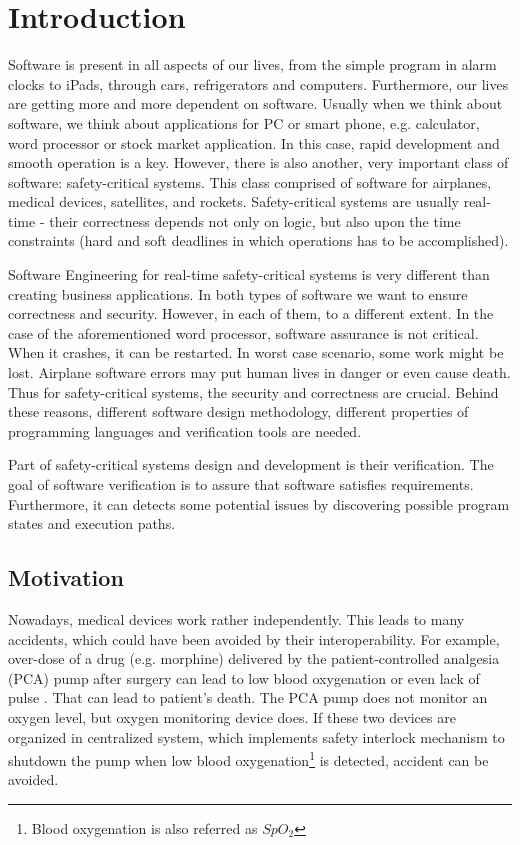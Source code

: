 
\cleardoublepage

\chapter{Introduction}
\label{introduction}

Software is present in all aspects of our lives, from the simple program in alarm clocks to iPads, through cars, refrigerators and computers. Furthermore, our lives are getting more and more dependent on software. Usually when we think about software, we think about applications for PC or smart phone, e.g. calculator, word processor or stock market application. In this case, rapid development and smooth operation is a key. However, there is also another, very important class of software: safety-critical systems. This class comprised of software for airplanes, medical devices, satellites, and rockets. Safety-critical systems are usually real-time - their correctness depends not only on logic, but also upon the time constraints (hard and soft deadlines in which operations has to be accomplished).

Software Engineering for real-time safety-critical systems is very different than creating business applications. In both types of software we want to ensure correctness and security. However, in each of them, to a different extent. In the case of the aforementioned word processor, software assurance is not critical. When it crashes, it can be restarted. In worst case scenario, some work might be lost. Airplane software errors may put human lives in danger or even cause death. Thus for safety-critical systems, the security and correctness are crucial. Behind these reasons, different software design methodology, different properties of programming languages and verification tools are needed.

Part of safety-critical systems design and development is their verification. The goal of software verification is to assure that software satisfies requirements. Furthermore, it can detects some potential issues by discovering possible program states and execution paths.


\section{Motivation}
\label{introduction:motivation}

Nowadays, medical devices work rather independently. This leads to many accidents, which could have been avoided by their interoperability. For example, over-dose of a drug (e.g. morphine) delivered by the patient-controlled analgesia (PCA) pump after surgery can lead to low blood oxygenation or even lack of pulse \cite{RespiratoryDepression:Article}. That can lead to patient's death. The PCA pump does not monitor an oxygen level, but oxygen monitoring device does. If these two devices are organized in centralized system, which implements safety interlock mechanism to shutdown the pump when low blood oxygenation\footnote{Blood oxygenation is also referred as $SpO_{2}$} is detected, accident can be avoided. 

